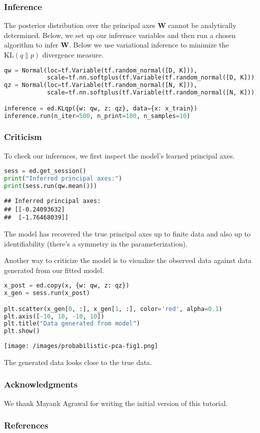 \subsubsection{Inference}

The posterior distribution over the principal axes $\mathbf{W}$ cannot
be analytically determined. Below, we set up our inference variables
and then run a chosen algorithm to infer $\mathbf{W}$. Below we use
variational inference to minimize the $\text{KL}(q\|p)$ divergence
measure.

\begin{lstlisting}[language=Python]
qw = Normal(loc=tf.Variable(tf.random_normal([D, K])),
            scale=tf.nn.softplus(tf.Variable(tf.random_normal([D, K]))))
qz = Normal(loc=tf.Variable(tf.random_normal([N, K])),
            scale=tf.nn.softplus(tf.Variable(tf.random_normal([N, K]))))

inference = ed.KLqp({w: qw, z: qz}, data={x: x_train})
inference.run(n_iter=500, n_print=100, n_samples=10)
\end{lstlisting}

\subsubsection{Criticism}

To check our inferences, we first inspect the model's learned
principal axes.

\begin{lstlisting}[language=Python]
sess = ed.get_session()
print("Inferred principal axes:")
print(sess.run(qw.mean()))
\end{lstlisting}

\begin{lstlisting}
## Inferred principal axes:
## [[-0.24093632]
##  [-1.76468039]]
\end{lstlisting}

The model has recovered the true principal axes up to finite data and
also up to identifiability (there's a symmetry in the
parameterization).

Another way to criticize the model is to visualize the observed data
against data generated from our fitted model.

\begin{lstlisting}[language=Python]
x_post = ed.copy(x, {w: qw, z: qz})
x_gen = sess.run(x_post)

plt.scatter(x_gen[0, :], x_gen[1, :], color='red', alpha=0.1)
plt.axis([-10, 10, -10, 10])
plt.title("Data generated from model")
plt.show()
\end{lstlisting}

\texttt{[image: /images/probabilistic-pca-fig1.png]}

The generated data looks close to the true data.

\subsubsection{Acknowledgments}

We thank Mayank Agrawal for writing the initial version of this
tutorial.

\subsubsection{References}\label{references}

